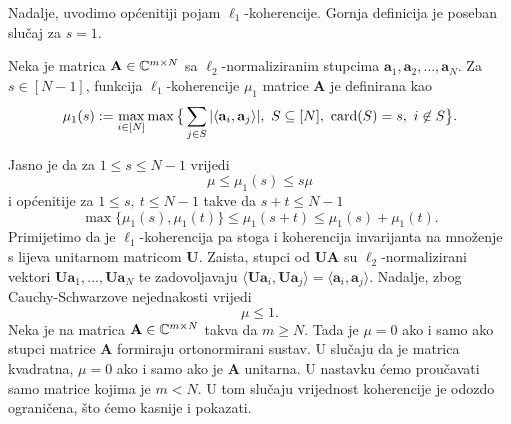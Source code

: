 \documentclass[a4paper,twoside,12pt]{memoir} %
\newcommand{\vect}[1]{\mathbf{#1}}
\renewcommand{\vec}{\vect}
\newcommand{\card}{\text{\normalfont{card}}}
\begin{document}
Nadalje, uvodimo op\'cenitiji pojam $\ell_1$-koherencije. Gornja definicija je poseban slu\v{c}aj za $s = 1$.
\begin{defn}
    Neka je matrica $\vec A \in \C^{m \times N}$ sa $\ell_2$-normaliziranim stupcima  $\vec a_1, \vec a_2, \dots, \vec a_N$. Za $s \in [N-1]$, funkcija $\ell_1$-koherencije $\mu_1$ matrice $\vec A$ je definirana kao
    \begin{equation*}
        \mu_1(s) := \max_{i \in [N]} \max \big\{ \sum_{j \in S} |\langle \vec a_i, \vec a_j \rangle|,\ S \subseteq [N],\ \card(S) = s,\ i \not \in S   \big\} .
    \end{equation*}
\end{defn}
Jasno je da za $1 \leq s \leq N-1$ vrijedi
\begin{equation}\label{5:2}
    \mu \leq \mu_1(s) \leq s \mu
\end{equation}
i op\'cenitije za $1 \leq s,\ t \leq N-1$ takve da $s+t \leq N-1$
\begin{equation}\label{5:3}
    \max \{\mu_1(s), \mu_1(t)\}  \leq \mu_1(s+t) \leq \mu_1(s) + \mu_1(t).
\end{equation}
Primijetimo da je $\ell_1$-koherencija pa stoga i koherencija invarijanta na mno\v{z}enje s lijeva unitarnom matricom $\vec U$. Zaista, stupci od $\vec{UA}$ su $\ell_2$-normalizirani vektori $\vec{Ua}_1, \dots, \vec{Ua}_N$ te zadovoljavaju $\langle \vec{Ua}_i, \vec{Ua}_j \rangle = \langle \vec a_i , \vec a_j \rangle$. Nadalje, zbog Cauchy-Schwarzove nejednakosti vrijedi
\begin{equation*}
   \mu \leq 1. 
\end{equation*}
Neka je na matrica $\vec A \in \C^{m \times N}$ takva da $m \geq N$. Tada je $\mu = 0$ ako i samo ako stupci matrice $\vec A$ formiraju ortonormirani sustav. U slu\v{c}aju da je matrica kvadratna, $\mu = 0$ ako i samo ako je $\vec A$ unitarna. U nastavku \'cemo prou\v{c}avati samo matrice kojima je $m < N$. U tom slu\v{c}aju vrijednost koherencije je odozdo ograni\v{c}ena, \v{s}to \'cemo kasnije i pokazati. 
\end{document}
